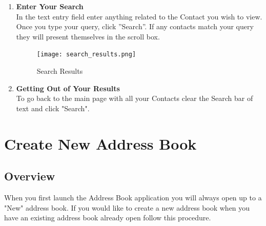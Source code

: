\documentclass[a4paper, 11pt]{article}
\begin{document}
\begin{enumerate}[label=\textbf{\arabic*})]
    \clearpage
    
    \item{\textbf{Enter Your Search}}\\ In the text entry field enter anything related to the Contact you wish to view. Once you type your query, click ”Search”. If any contacts match your query they will present themselves in the scroll box.

    
    \begin{figure}[h!]
    \centering
      \texttt{[image: search\_results.png]}
      \caption{Search Results}
    \end{figure} 
    
    \item{\textbf{Getting Out of Your Results}}\\ To go back to the main page with all your Contacts clear the Search bar of text and click "Search".

\end{enumerate}

\clearpage

\section{Create New Address Book}
\subsection{Overview}
When you first launch the Address Book application you will always open up to a "New" address book. If you would like to create a new address book when you have an existing address book already open follow this procedure. 
\end{document}
